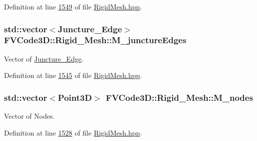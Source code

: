 Definition at line \hyperlink{RigidMesh_8hpp_source_l01549}{1549} of file \hyperlink{RigidMesh_8hpp_source}{Rigid\+Mesh.\+hpp}.

\subsubsection[{\texorpdfstring{M\+\_\+juncture\+Edges}{M_junctureEdges}}]{\setlength{\rightskip}{0pt plus 5cm}std\+::vector$<${\bf Juncture\+\_\+\+Edge}$>$ F\+V\+Code3\+D\+::\+Rigid\+\_\+\+Mesh\+::\+M\+\_\+juncture\+Edges\hspace{0.3cm}{\ttfamily [protected]}}\hypertarget{classFVCode3D_1_1Rigid__Mesh_a01850de43f4d5d1dcf617d7697bcf3e8}{}\label{classFVCode3D_1_1Rigid__Mesh_a01850de43f4d5d1dcf617d7697bcf3e8}


Vector of \hyperlink{classFVCode3D_1_1Rigid__Mesh_1_1Juncture__Edge}{Juncture\+\_\+\+Edge}. 



Definition at line \hyperlink{RigidMesh_8hpp_source_l01545}{1545} of file \hyperlink{RigidMesh_8hpp_source}{Rigid\+Mesh.\+hpp}.

\subsubsection[{\texorpdfstring{M\+\_\+nodes}{M_nodes}}]{\setlength{\rightskip}{0pt plus 5cm}std\+::vector$<${\bf Point3D}$>$ F\+V\+Code3\+D\+::\+Rigid\+\_\+\+Mesh\+::\+M\+\_\+nodes\hspace{0.3cm}{\ttfamily [protected]}}\hypertarget{classFVCode3D_1_1Rigid__Mesh_a400c29e5aa35a8dbdbcdca33c104a4b9}{}\label{classFVCode3D_1_1Rigid__Mesh_a400c29e5aa35a8dbdbcdca33c104a4b9}


Vector of Nodes. 



Definition at line \hyperlink{RigidMesh_8hpp_source_l01528}{1528} of file \hyperlink{RigidMesh_8hpp_source}{Rigid\+Mesh.\+hpp}.

